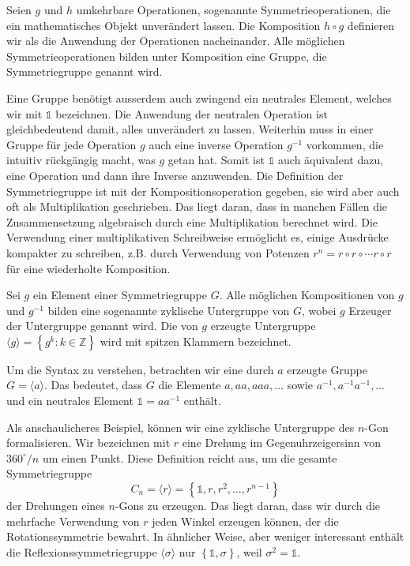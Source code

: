 \begin{definition}[Symmetriegruppe]
  Seien \(g\) und \(h\) umkehrbare Operationen, sogenannte Symmetrieoperationen, die ein mathematisches Objekt unverändert lassen.
  Die Komposition \(h\circ g\) definieren wir als die Anwendung der Operationen nacheinander.
  Alle möglichen Symmetrieoperationen bilden unter Komposition eine Gruppe, die Symmetriegruppe genannt wird.
\end{definition}

Eine Gruppe benötigt ausserdem auch zwingend ein neutrales Element, welches wir mit \(\mathds{1}\) bezeichnen.
Die Anwendung der neutralen Operation ist gleichbedeutend damit, alles unverändert zu lassen.
Weiterhin muss in einer Gruppe für jede Operation \(g\) auch eine inverse Operation \(g^{-1}\) vorkommen, die intuitiv rückgängig macht, was \(g\) getan hat. %
Somit ist \(\mathds{1}\) auch äquivalent dazu, eine Operation und dann ihre Inverse anzuwenden.
 Die Definition der Symmetriegruppe ist mit der Kompositionsoperation gegeben, sie wird aber auch oft als Multiplikation geschrieben.
Das liegt daran, dass in manchen Fällen die Zusammensetzung algebraisch durch eine Multiplikation berechnet wird.
Die Verwendung einer multiplikativen Schreibweise ermöglicht es, einige Ausdrücke kompakter zu schreiben, z.B.
durch Verwendung von Potenzen \(r^n = r\circ r \circ \cdots r\circ r\) für eine wiederholte Komposition.

\begin{definition}
  Sei \(g\) ein Element einer Symmetriegruppe \(G\).
  Alle möglichen Kompositionen von \(g\) und \(g^{-1}\) bilden eine sogenannte zyklische Untergruppe von \(G\), wobei \(g\) Erzeuger der Untergruppe genannt wird.
  Die von \(g\) erzeugte Untergruppe \(\langle g \rangle = \left\{ g^k : k \in \mathbb{Z} \right\}\) wird mit spitzen Klammern bezeichnet.
\end{definition}
\begin{beispiel}
  Um die Syntax zu verstehen, betrachten wir eine durch \(a\) erzeugte Gruppe \(G = \langle a \rangle\).
  Das bedeutet, dass \(G\) die Elemente \(a, aa, aaa, \ldots\) sowie \(a^{-1}, a^{-1}a^{-1}, \ldots\) und ein neutrales Element \(\mathds{1} = aa^{-1}\) enthält.
\end{beispiel}
\begin{beispiel}
  Als anschaulicheres Beispiel, können wir eine zyklische Untergruppe des \(n\)-Gon formalisieren.
  Wir bezeichnen mit \(r\) eine Drehung im Gegenuhrzeigersinn von \(360^\circ/n\) um einen Punkt.
  Diese Definition reicht aus, um die gesamte Symmetriegruppe
  \[
    C_n = \langle r \rangle
      = \left\{\mathds{1}, r, r^2, \ldots, r^{n-1}\right\}
  \]
  der Drehungen eines \(n\)-Gons zu erzeugen.
  Das liegt daran, dass wir durch die mehrfache Verwendung von \(r\) jeden Winkel erzeugen k\"onnen, der die Rotationssymmetrie bewahrt.
  In ähnlicher Weise, aber weniger interessant  enthält die Reflexionssymmetriegruppe \(\langle\sigma\rangle\) nur \(\left\{\mathds{1}, \sigma\right\}\), weil \(\sigma^2 = \mathds{1}\).
\end{beispiel}

